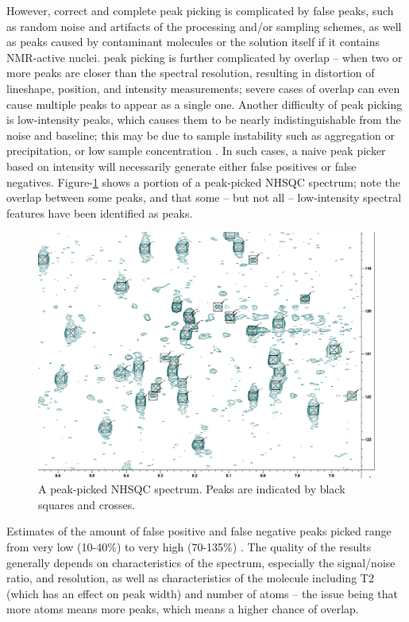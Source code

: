 However, correct and complete peak picking is complicated by false peaks, 
such as random noise and artifacts of the processing and/or sampling schemes, 
as well as peaks caused by contaminant molecules or the solution itself if it 
contains NMR-active nuclei.  peak picking is further complicated by overlap -- 
when two or more peaks are closer than the spectral resolution, resulting in 
distortion of lineshape, position, and intensity measurements; severe cases 
of overlap can even cause multiple peaks to appear as a single one.  Another 
difficulty of peak picking is low-intensity peaks, which causes them to be 
nearly indistinguishable from the noise and baseline; this may be due to 
sample instability such as aggregation or precipitation, or low sample 
concentration
\cite{picky, munin, korzhnev2001munin, apart,
autopsy, pine}
\cite{williamson2009automated, guntert2009automated, altieri2004automation,
baran2004automated}.
In such cases, a naive peak picker based on intensity will necessarily 
generate either false positives or false negatives.
Figure-\ref{nhsqc_peaks} shows a portion of a peak-picked
NHSQC spectrum; note the overlap between some peaks, and that some -- but not
all -- low-intensity spectral features have been identified as peaks.
\begin{figure}
  \includegraphics[scale=0.35]{figures/nhsqc_peaks}
  \caption[A peak-picked NHSQC spectrum]
          {A peak-picked NHSQC spectrum. 
           Peaks are indicated by black squares and crosses.}
  \label{nhsqc_peaks}
\end{figure}

Estimates of the amount of false positive and false negative peaks picked 
range from very low (10-40\%) to very high (70-135\%) \cite{pine}. 
The quality of the results generally depends on characteristics of the 
spectrum, especially the signal/noise ratio, and resolution, as well as 
characteristics of the molecule including T2 (which has an effect on peak 
width) and number of atoms -- the issue being that more atoms means more 
peaks, which means a higher chance of overlap.

